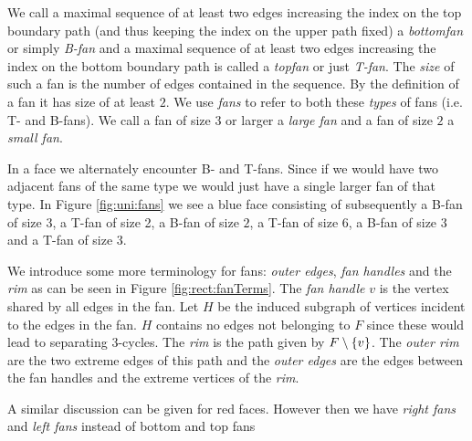     We call a maximal sequence of at least two edges increasing the index on the top boundary path (and thus keeping the index on the upper path fixed) a \emph{bottomfan} or simply \emph{B-fan} and a maximal sequence of at least two edges increasing the index on the bottom boundary path is called a \emph{topfan} or just \emph{T-fan}.
    The \emph{size} of such a fan is the number of edges contained in the sequence. By the definition of a fan it has size of at least $2$.
    We use \emph{fans} to refer to both these \emph{types} of fans (i.e. T- and B-fans).
    We call a fan of size $3$ or larger a \emph{large fan} and a fan of size $2$ a \emph{small fan}.

    In a face we alternately encounter B- and T-fans. Since if we would have two adjacent fans of the same type we would just have a single larger fan of that type.
    In Figure \ref{fig:uni:fans} we see a blue face consisting of subsequently a B-fan of size $3$, a T-fan of size 2, a B-fan of size $2$, a T-fan of size $6$, a B-fan of size $3$ and a T-fan of size $3$.



     We introduce some more terminology for fans: \emph{outer edges}, \emph{fan handles} and the \emph{rim} as can be seen in Figure \ref{fig:rect:fanTerms}. The \emph{fan handle} $v$ is the vertex shared by all edges in the fan. Let $H$ be the induced subgraph of vertices incident to the edges in the fan. $H$ contains no edges not belonging to $F$ since these would lead to separating 3-cycles. The \emph{rim} is the path given by $F\setminus \left\lbrace {v} \right\rbrace$.
     The \emph{outer rim} are the two extreme edges of this path and the \emph{outer edges} are the edges between the fan handles and the extreme vertices of the \emph{rim}.

     A similar discussion can be given for red faces. However then we have \emph{right fans} and \emph{left fans} instead of bottom and top fans





